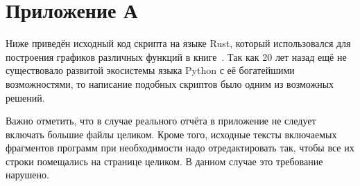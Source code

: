 \section{Приложение А}

Ниже приведён исходный код скрипта на языке Rust, который использовался для
построения графиков различных функций в книге~\cite{roganov-jurists}.
Так как 20 лет назад ещё не существовало развитой экосистемы языка Python
с её богатейшими возможностями, то написание подобных скриптов было одним
из возможных решений.

Важно отметить, что в случае реального отчёта в приложение не следует включать
большие файлы целиком. Кроме того, исходные тексты включаемых фрагментов
программ при необходимости надо отредактировать так, чтобы все их строки
помещались на странице целиком. В данном случае это требование нарушено.



